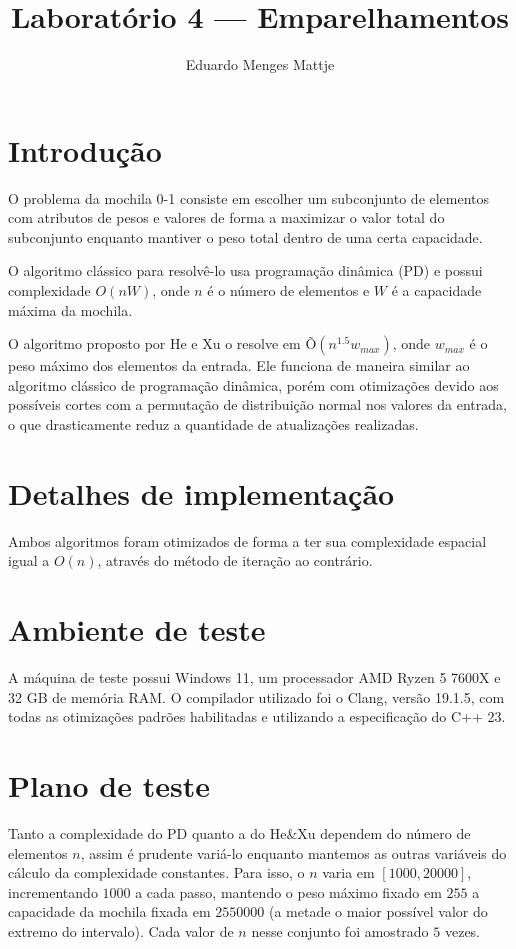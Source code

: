 \documentclass[11pt]{article}
\title{Laboratório 4 — Emparelhamentos}
\author{Eduardo Menges Mattje}
\begin{document}
    \maketitle


    \section{Introdução}
    O problema da mochila 0-1 consiste em escolher um subconjunto de elementos com atributos de pesos e valores de forma a maximizar o valor total do subconjunto enquanto mantiver o peso total dentro de uma certa capacidade.

    O algoritmo clássico para resolvê-lo usa programação dinâmica (PD) e possui complexidade $O(nW)$, onde $n$ é o número de elementos e $W$ é a capacidade máxima da mochila.

    O algoritmo proposto por He e Xu o resolve em $Õ(n^{1.5}w_{max})$, onde $w_{max}$ é o peso máximo dos elementos da entrada.
    Ele funciona de maneira similar ao algoritmo clássico de programação dinâmica, porém com otimizações devido aos possíveis cortes com a permutação de distribuição normal nos valores da entrada, o que drasticamente reduz a quantidade de atualizações realizadas.


    \section{Detalhes de implementação}
    \label{sec:implementation-details}

    Ambos algoritmos foram otimizados de forma a ter sua complexidade espacial igual a $O(n)$, através do método de iteração ao contrário.


    \section{Ambiente de teste}

    A máquina de teste possui Windows 11, um processador AMD Ryzen 5 7600X e 32 GB de memória RAM. O compilador utilizado foi o Clang, versão 19.1.5, com todas as otimizações padrões habilitadas e utilizando a especificação do C++ 23.


    \section{Plano de teste}

    Tanto a complexidade do PD quanto a do He\&Xu dependem do número de elementos $n$, assim é prudente variá-lo enquanto mantemos as outras variáveis do cálculo da complexidade constantes.
    Para isso, o $n$ varia em $[1000, 20000]$, incrementando $1000$ a cada passo, mantendo o peso máximo fixado em $255$ a capacidade da mochila fixada em $2550000$ (a metade o maior possível valor do extremo do intervalo).
    Cada valor de $n$ nesse conjunto foi amostrado $5$ vezes.
\end{document}
